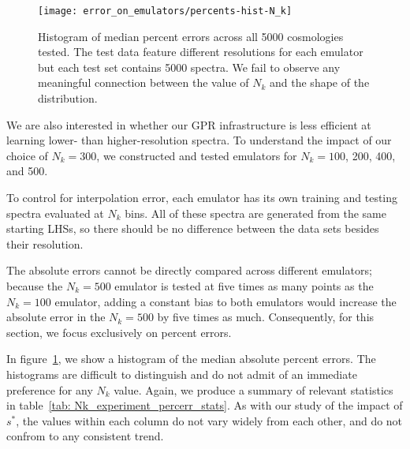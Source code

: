 \begin{figure}[ht!]
  \centering
  \texttt{[image: error\_on\_emulators/percents-hist-N\_k]}
  \caption[Impact of $N_k$ on Accuracy]{Histogram of median percent errors
  	across all 5000 cosmologies tested. The test data feature different
  	resolutions for each
  	emulator but each test set contains 5000 spectra. We fail to observe any
  	meaningful connection between the value of $N_k$ and the shape of the
  	distribution.}
  \label{fig: Nk_experiment}
\end{figure}

We are also interested in whether our GPR infrastructure is less efficient at
learning lower- than higher-resolution spectra. To understand the impact of 
our choice of $N_k = 300$, we constructed and tested emulators for
$N_k = 100$, 200, 400, and 500.

To control for interpolation error, each emulator has its own training and
testing spectra evaluated at $N_k$ bins. All of these spectra are
generated from the same starting LHSs, so there should be no difference
between the data sets besides their resolution.

The absolute errors cannot be directly compared across different emulators;
because the $N_k = 500$ emulator is tested at five times as many points as the 
$N_k = 100$ emulator, adding a constant bias to both emulators would increase
the absolute error in the $N_k = 500$ by five times as much. Consequently, for 
this section, we focus exclusively on percent errors.

In figure~\ref{fig: Nk_experiment}, we show a histogram of the median absolute
percent errors. The histograms are difficult to distinguish and do not admit
of an immediate preference for any $N_k$ value. Again, we produce a summary
of relevant statistics in table~\ref{tab: Nk_experiment_percerr_stats}. As
with our study of the impact of $s^*$, the values within each column do not
vary widely from each other, and do not confrom to any consistent trend.

